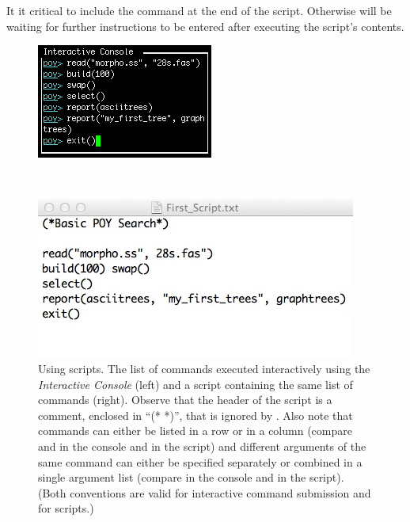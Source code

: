 {It it critical to include the command  at the end of the script. Otherwise \poy will be waiting for further 
instructions to be entered after executing the script's contents.

\begin{figure}
\centering
\begin{minipage}[c]{0.42\textwidth}
   		\includegraphics[width=\textwidth]{doc/figures/commandlist.jpg}
\end{minipage}
\,
\begin{minipage}[c]{0.53\textwidth}
	   	\includegraphics[width=\textwidth]{doc/figures/script.jpg}
   	\end{minipage}
\caption{Using \poy scripts. The list of commands executed interactively using the \emph{Interactive Console} 
(left) and a script containing the same list of commands (right). Observe that the header of the script is a comment, 
enclosed in ``(* *)'', that is ignored by \poy. Also note that commands can either be listed in a row or in a column 
(compare  and  in the console and in the script) and different 
arguments of the same command can either be specified separately or combined in a single argument list 
(compare  in the console and in the script). (Both conventions are valid for interactive 
command submission and for scripts.)}
\label{fig:script}
\end{figure}

}
